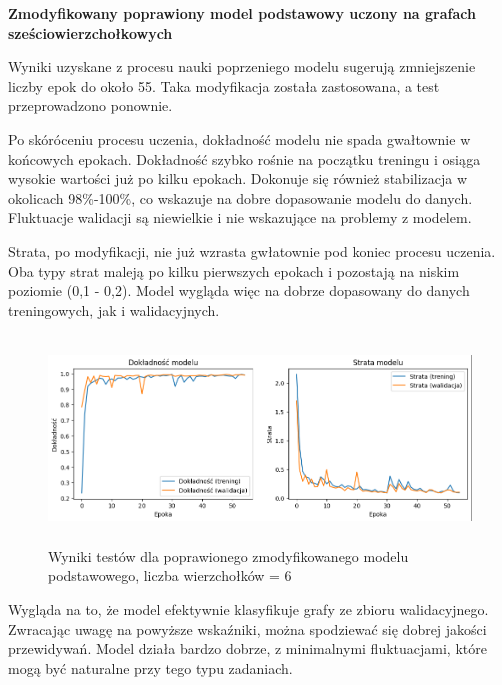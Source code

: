 
\textbf{Zmodyfikowany poprawiony model podstawowy uczony na grafach sześciowierzchołkowych}

Wyniki uzyskane z procesu nauki poprzeniego modelu sugerują zmniejszenie liczby epok do około 55.
Taka modyfikacja została zastosowana, a test przeprowadzono ponownie.

Po skóróceniu procesu uczenia, dokładność modelu nie spada gwałtownie w końcowych epokach.
Dokładność szybko rośnie na początku treningu i osiąga wysokie wartości już po kilku epokach.
Dokonuje się również stabilizacja w okolicach 98\%-100\%, co wskazuje na dobre dopasowanie modelu do danych.
Fluktuacje walidacji są niewielkie i nie wskazujące na problemy z modelem.

Strata, po modyfikacji, nie już wzrasta gwłatownie pod koniec procesu uczenia.
Oba typy strat maleją po kilku pierwszych epokach i pozostają na niskim poziomie (0,1 - 0,2).
Model wygląda więc na dobrze dopasowany do danych treningowych, jak i walidacyjnych.

\begin{figure}[ht]
	\centering
	\includegraphics[height=5.5cm]{resources/tests/images/v4/base6_1_1_img.png}
	\caption{Wyniki testów dla poprawionego zmodyfikowanego modelu podstawowego, liczba wierzchołków = 6}
	\label{Fig:tests-base-6a}
\end{figure}
\FloatBarrier

Wygląda na to, że model efektywnie klasyfikuje grafy ze zbioru walidacyjnego.
Zwracając uwagę na powyższe wskaźniki, można spodziewać się dobrej jakości przewidywań.
Model działa bardzo dobrze, z minimalnymi fluktuacjami, które mogą być naturalne przy tego typu zadaniach.

